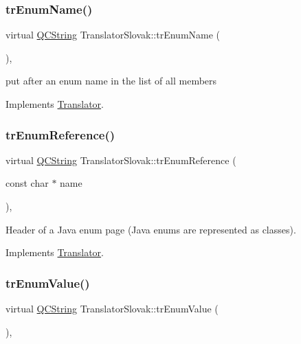 \mbox{\label{class_translator_slovak_ae65715536404a08fc6044f3217697b34}} 
\subsubsection{\texorpdfstring{trEnumName()}{trEnumName()}}
{\footnotesize\ttfamily virtual \mbox{\hyperlink{class_q_c_string}{Q\+C\+String}} Translator\+Slovak\+::tr\+Enum\+Name (\begin{DoxyParamCaption}{ }\end{DoxyParamCaption})\hspace{0.3cm}{\ttfamily [inline]}, {\ttfamily [virtual]}}

put after an enum name in the list of all members 

Implements \mbox{\hyperlink{class_translator}{Translator}}.

\mbox{\label{class_translator_slovak_affe6c1f59e815ca0300f495dc5f346fd}} 
\subsubsection{\texorpdfstring{trEnumReference()}{trEnumReference()}}
{\footnotesize\ttfamily virtual \mbox{\hyperlink{class_q_c_string}{Q\+C\+String}} Translator\+Slovak\+::tr\+Enum\+Reference (\begin{DoxyParamCaption}\item[{const char $\ast$}]{name }\end{DoxyParamCaption})\hspace{0.3cm}{\ttfamily [inline]}, {\ttfamily [virtual]}}

Header of a Java enum page (Java enums are represented as classes). 

Implements \mbox{\hyperlink{class_translator}{Translator}}.

\mbox{\label{class_translator_slovak_a63bebee96bc109ab30d25978c4aa26d3}} 
\subsubsection{\texorpdfstring{trEnumValue()}{trEnumValue()}}
{\footnotesize\ttfamily virtual \mbox{\hyperlink{class_q_c_string}{Q\+C\+String}} Translator\+Slovak\+::tr\+Enum\+Value (\begin{DoxyParamCaption}{ }\end{DoxyParamCaption})\hspace{0.3cm}{\ttfamily [inline]}, {\ttfamily [virtual]}}

